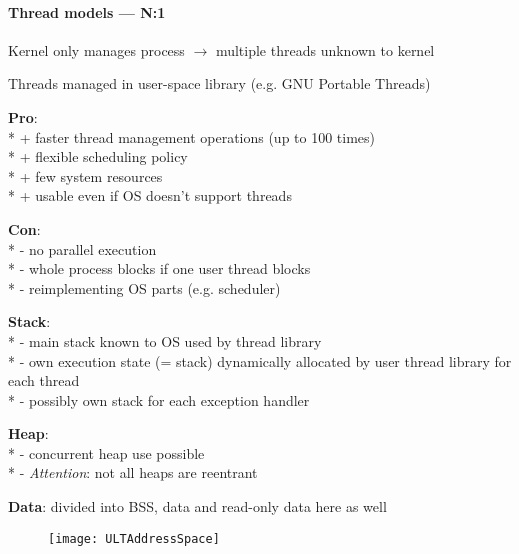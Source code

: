 \paragraph{Thread models --- N:1}
\begin{items}
  \item Kernel only manages process \( \to \) multiple threads unknown to kernel 
  \item Threads managed in user-space library (e.g. GNU Portable Threads)
  \item \textbf{Pro}: \\*
    + faster thread management operations (up to 100 times) \\*
    + flexible scheduling policy \\*
    + few system resources \\*
    + usable even if OS doesn't support threads
  \item \textbf{Con}: \\*
    - no parallel execution \\*
    - whole process blocks if one user thread blocks \\*
    - reimplementing OS parts (e.g. scheduler)
  \item \textbf{Stack}: \\*
    - main stack known to OS used by thread library \\*
    - own execution state (= stack) dynamically allocated by user thread library for each thread \\*
    - possibly own stack for each exception handler
  \item \textbf{Heap}: \\*
    - concurrent heap use possible \\*
    - \emph{Attention}: not all heaps are reentrant
  \item \textbf{Data}: divided into BSS, data and read-only data here as well
\end{items}
\begin{figure}[H]\centering\label{ULTAddressSpace}\texttt{[image: ULTAddressSpace]}\end{figure}

